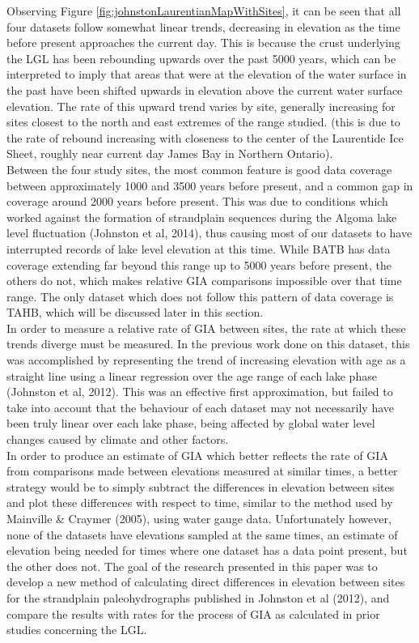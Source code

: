 \documentclass{article}
\begin{document}
 
 Observing Figure \ref{fig:johnstonLaurentianMapWithSites}, it can be seen that
 all four datasets follow somewhat
 linear trends, decreasing in elevation as the time before present approaches the
 current day.
 This is because the crust underlying the LGL has been rebounding upwards
 over the past 5000 years, which can be interpreted to imply that areas that were at the
 elevation of the water surface in the past have been shifted upwards in elevation
 above the current water surface elevation. The rate of this upward trend varies
 by site, generally increasing for sites closest to the north and east extremes
 of the range studied.
 (this is due to the rate of rebound increasing with closeness to the center of
 the Laurentide Ice Sheet, roughly near current day James Bay in Northern Ontario).\\
 Between the four study sites, the most common feature is good data coverage between
 approximately 1000 and 3500 years before present, and a common gap in coverage around 2000
 years before present. This was due to conditions which worked against the
 formation of strandplain sequences during the Algoma lake level fluctuation
 (Johnston et al, 2014), thus causing most of our datasets to have interrupted
 records of lake level elevation at this time. While BATB has data
 coverage extending far beyond this range up to 5000 years before present, the others do not, which makes relative GIA
 comparisons impossible over that time range. The only dataset which does not follow
 this pattern of data coverage is TAHB, which will be discussed later in this section.\\ 
 In order to measure a relative rate of GIA between sites, the rate at which these
 trends diverge must be measured. In the previous work done on this dataset, this
 was accomplished by representing the trend of increasing elevation with age as
 a straight line using a linear regression over the age range of each lake phase (Johnston et al, 2012). This was an
 effective first approximation, but failed to take into account that the behaviour
 of each dataset may not necessarily have been truly linear over each lake phase, being affected by
 global water level changes caused by climate and other factors. \\
 In order to produce an estimate of GIA which better reflects the rate of GIA from
 comparisons made between elevations measured at similar times, a better strategy would be to simply subtract
 the differences in elevation between sites and plot these differences with
 respect to time, similar to the method used by Mainville \& Craymer (2005), using
 water gauge data. Unfortunately however, none of the datasets have elevations
 sampled at the same times, an estimate of elevation being needed for times where
 one dataset
 has a data point present, but the other does not. The goal of the research
 presented in this paper was to develop a new method of calculating direct differences
 in elevation between sites for the strandplain paleohydrographs published in
 Johnston et al (2012), and compare the results with rates for the process of GIA
 as calculated in prior studies concerning the LGL. \\

 
\end{document}
